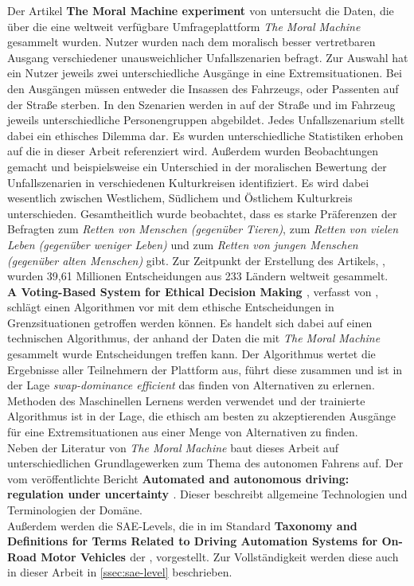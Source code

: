 Der Artikel \textbf{The Moral Machine experiment \cite{moralMachine}} von \citeauthor{moralMachine} untersucht die Daten, die über die eine weltweit verfügbare Umfrageplattform \textit{The Moral Machine} gesammelt wurden. Nutzer wurden nach dem moralisch besser vertretbaren Ausgang verschiedener unausweichlicher Unfallszenarien befragt. Zur Auswahl hat ein Nutzer jeweils zwei unterschiedliche Ausgänge in eine Extremsituationen. Bei den Ausgängen müssen entweder die Insassen des Fahrzeugs, oder Passenten auf der Straße sterben. In den Szenarien werden in auf der Straße und im Fahrzeug jeweils unterschiedliche Personengruppen abgebildet. Jedes Unfallszenarium stellt dabei ein ethisches Dilemma dar. Es wurden unterschiedliche Statistiken erhoben auf die in dieser Arbeit referenziert wird. Außerdem wurden Beobachtungen gemacht und beispielsweise ein Unterschied in der moralischen Bewertung der Unfallszenarien in verschiedenen Kulturkreisen identifiziert. Es wird dabei wesentlich zwischen Westlichem, Südlichem und Östlichem Kulturkreis unterschieden. Gesamtheitlich wurde beobachtet, dass es starke Präferenzen der Befragten zum \textit{Retten von Menschen (gegenüber Tieren)}, zum \textit{Retten von vielen Leben (gegenüber weniger Leben)} und zum \textit{Retten von jungen Menschen (gegenüber alten Menschen)} gibt. Zur Zeitpunkt der Erstellung des Artikels, \citeyear{moralMachine}, wurden 39,61 Millionen Entscheidungen aus 233 Ländern weltweit gesammelt. \\

\textbf{A Voting-Based System for Ethical Decision Making \cite{votingBasedSystem}}, verfasst von \citeauthor{votingBasedSystem}, schlägt einen Algorithmen vor mit dem ethische Entscheidungen in Grenzsituationen getroffen werden können. Es handelt sich dabei auf einen technischen Algorithmus, der anhand der Daten die mit \textit{The Moral Machine} gesammelt wurde Entscheidungen treffen kann. Der Algorithmus wertet die Ergebnisse aller Teilnehmern der Plattform aus, führt diese zusammen und ist in der Lage  \textit{swap-dominance efficient} das finden von Alternativen zu erlernen. Methoden des Maschinellen Lernens werden verwendet und der trainierte Algorithmus ist in der Lage, die ethisch am besten zu akzeptierenden Ausgänge für eine Extremsituationen aus einer Menge von Alternativen zu finden.\\

Neben der Literatur von \textit{The Moral Machine} baut dieses Arbeit auf unterschiedlichen Grundlagewerken zum Thema des autonomen Fahrens auf. Der vom \citeauthor{smith2015automated} veröffentlichte Bericht \textbf{Automated and
autonomous driving: regulation under uncertainty \cite{smith2015automated}}. Dieser beschreibt allgemeine Technologien und Terminologien der Domäne.\\

Außerdem werden die SAE-Levels, die in im Standard \textbf{Taxonomy and Definitions for Terms Related to Driving Automation Systems for On-Road Motor Vehicles \cite{standardSAE}} der \citeauthor{standardSAE}, vorgestellt. Zur Vollständigkeit werden diese auch in dieser Arbeit in \ref{ssec:sae-level} beschrieben.\\
